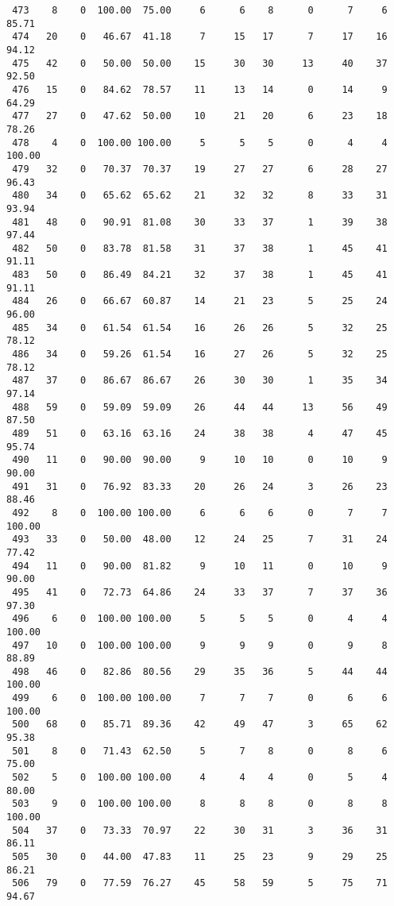 \begin{verbatim}
 473    8    0  100.00  75.00     6      6    8      0      7     6    85.71
 474   20    0   46.67  41.18     7     15   17      7     17    16    94.12
 475   42    0   50.00  50.00    15     30   30     13     40    37    92.50
 476   15    0   84.62  78.57    11     13   14      0     14     9    64.29
 477   27    0   47.62  50.00    10     21   20      6     23    18    78.26
 478    4    0  100.00 100.00     5      5    5      0      4     4   100.00
 479   32    0   70.37  70.37    19     27   27      6     28    27    96.43
 480   34    0   65.62  65.62    21     32   32      8     33    31    93.94
 481   48    0   90.91  81.08    30     33   37      1     39    38    97.44
 482   50    0   83.78  81.58    31     37   38      1     45    41    91.11
 483   50    0   86.49  84.21    32     37   38      1     45    41    91.11
 484   26    0   66.67  60.87    14     21   23      5     25    24    96.00
 485   34    0   61.54  61.54    16     26   26      5     32    25    78.12
 486   34    0   59.26  61.54    16     27   26      5     32    25    78.12
 487   37    0   86.67  86.67    26     30   30      1     35    34    97.14
 488   59    0   59.09  59.09    26     44   44     13     56    49    87.50
 489   51    0   63.16  63.16    24     38   38      4     47    45    95.74
 490   11    0   90.00  90.00     9     10   10      0     10     9    90.00
 491   31    0   76.92  83.33    20     26   24      3     26    23    88.46
 492    8    0  100.00 100.00     6      6    6      0      7     7   100.00
 493   33    0   50.00  48.00    12     24   25      7     31    24    77.42
 494   11    0   90.00  81.82     9     10   11      0     10     9    90.00
 495   41    0   72.73  64.86    24     33   37      7     37    36    97.30
 496    6    0  100.00 100.00     5      5    5      0      4     4   100.00
 497   10    0  100.00 100.00     9      9    9      0      9     8    88.89
 498   46    0   82.86  80.56    29     35   36      5     44    44   100.00
 499    6    0  100.00 100.00     7      7    7      0      6     6   100.00
 500   68    0   85.71  89.36    42     49   47      3     65    62    95.38
 501    8    0   71.43  62.50     5      7    8      0      8     6    75.00
 502    5    0  100.00 100.00     4      4    4      0      5     4    80.00
 503    9    0  100.00 100.00     8      8    8      0      8     8   100.00
 504   37    0   73.33  70.97    22     30   31      3     36    31    86.11
 505   30    0   44.00  47.83    11     25   23      9     29    25    86.21
 506   79    0   77.59  76.27    45     58   59      5     75    71    94.67

\end{verbatim}
